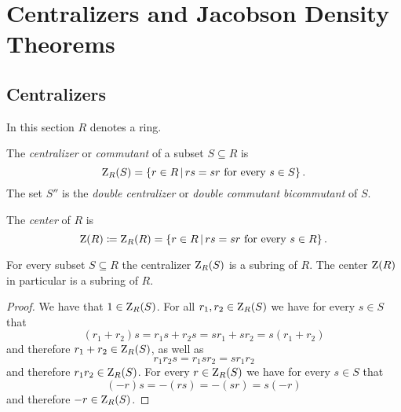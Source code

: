 \section{Centralizers and Jacobson Density Theorems}





\subsection{Centralizers}


\begin{conventions}
  In this section $R$ denotes a ring.
\end{conventions}


\begin{definition}
  The \emph{centralizer} or \emph{commutant} of a subset $S \subseteq R$ is
  \[
      \centralizer_R(S)
    = \{
        r \in R
      \suchthat
        \text{$rs = sr$ for every $s \in S$}
      \} \,.
  \]
  The set $S''$ is the \emph{double centralizer} or \emph{double commutant} \emph{bicommutant} of $S$.
\end{definition}


\begin{definition}
  The \emph{center} of $R$ is
  \[
              \ringcenter(R)
    \defined  \centralizer_R(R)
    =         \{
                r \in R
              \suchthat
                \text{$rs = sr$ for every $s \in R$}
              \} \,.
  \]
\end{definition}


\begin{lemma}
  For every subset $S \subseteq R$ the centralizer $\operatorname{Z}_R(S)$ is a subring of $R$.
  The center $\operatorname{Z}(R)$ in particular is a subring of $R$.
\end{lemma}


\begin{proof}
  We have that $1 \in \operatorname{Z}_R(S)$.
  For all $r_1, r_2 \in \operatorname{Z}_R(S)$ we have for every $s \in S$ that
  \[
      (r_1 + r_2)s
    = r_1 s + r_2 s
    = s r_1 + s r_2
    = s (r_1 + r_2)
  \]
  and therefore $r_1 + r_2 \in \operatorname{Z}_R(S)$, as well as
  \[
      r_1 r_2 s
    = r_1 s r_2
    = s r_1 r_2
  \]
  and therefore $r_1 r_2 \in \operatorname{Z}_R(S)$.
  For every $r \in \operatorname{Z}_R(S)$ we have for every $s \in S$ that
  \[
      (-r) s
    = - (rs)
    = - (sr)
    = s (-r)
  \]
  and therefore $-r \in \operatorname{Z}_R(S)$.
\end{proof}


